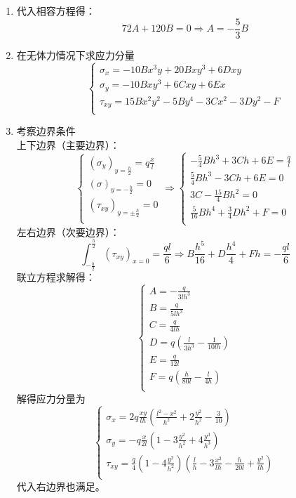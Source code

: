 \begin{remark}
	\quad
	\begin{enumerate}
		\item 代入相容方程得：\[72A+120B=0\Longrightarrow A=-\frac{5}{3}B\]
		\item 在无体力情况下求应力分量\[\begin{cases}
		\sigma _x=-10Bx^3y+20Bxy^3+6Dxy\\
		\sigma _y=-10Bxy^3+6Cxy+6Ex\\
		\tau _{xy}=15Bx^2y^2-5By^4-3Cx^2-3Dy^2-F\\
		\end{cases}\]
		\item 考察边界条件\\
		上下边界（主要边界）：\[\begin{cases}
		\left( \sigma _y \right) _{y=\frac{h}{2}}=q\frac{x}{l}\\
		\left( \sigma \right) _{y=-\frac{h}{2}}=0\\
		\left( \tau _{xy} \right) _{y=\pm \frac{h}{2}}=0\\
		\end{cases}\Longrightarrow \begin{cases}
		-\frac{5}{4}Bh^3+3Ch+6E=\frac{q}{l}\\
		\frac{5}{4}Bh^3-3Ch+6E=0\\
		3C-\frac{15}{4}Bh^2=0\\
		\frac{5}{16}Bh^4+\frac{3}{4}Dh^2+F=0\\
		\end{cases}\]
		左右边界（次要边界）：\[\int_{-\frac{h}{2}}^{\frac{h}{2}}{\left( \tau _{xy} \right) _{x=0}}=\frac{ql}{6}\Longrightarrow B\frac{h^5}{16}+D\frac{h^4}{4}+Fh=-\frac{ql}{6}\]
		联立方程求解得：\[\begin{cases}
		A=-\frac{q}{3lh^3}\\
		B=\frac{q}{5lh^3}\\
		C=\frac{q}{4lh}\\
		D=q\left( \frac{l}{3h^3}-\frac{1}{10lh} \right)\\
		E=\frac{q}{12l}\\
		F=q\left( \frac{h}{80l}-\frac{l}{4h} \right)\\
		\end{cases}\]
		解得应力分量为\[\begin{cases}
		\sigma _x=2q\frac{xy}{lh}\left( \frac{l^2-x^2}{h^2}+2\frac{y^2}{h^2}-\frac{3}{10} \right)\\
		\sigma _y=-q\frac{x}{2l}\left( 1-3\frac{y^2}{h^2}+4\frac{y^3}{h^3} \right)\\
		\tau _{xy}=\frac{q}{4}\left( 1-4\frac{y^2}{h^2} \right) \left( \frac{l}{h}-3\frac{x^2}{lh}-\frac{h}{20l}+\frac{y^2}{lh} \right)\\
		\end{cases}\]
		代入右边界也满足。
	\end{enumerate}
\end{remark}
